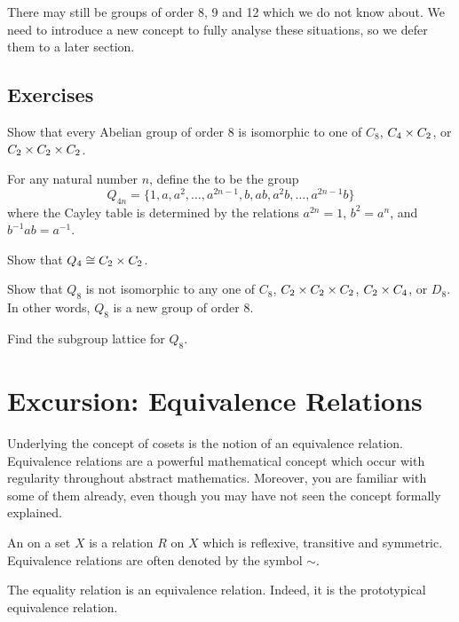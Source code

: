 There may still be groups of order 8, 9 and 12 which we do not know
about.  We need to introduce a new concept to fully analyse these
situations, so we defer them to a later section.

\subsection*{Exercises}

\begin{exercises}
  \item Show that every Abelian group of order 8 is isomorphic to one of
  $C_{8}$, $C_{4} \times C_{2}$, or $C_{2} \times C_{2} \times C_{2}$.
  
  \item\label{ex:quaterniongroup} For any natural number $n$, define the  to be the group
  \[
    Q_{4n} = \{1, a, a^{2}, \ldots, a^{2n-1}, b, ab, a^{2}b, \ldots, a^{2n-1}b \}
  \]
  where the Cayley table is determined by the relations $a^{2n} = 1$, $b^{2} =
  a^{n}$, and $b^{-1}ab = a^{-1}$.
  
  Show that $Q_{4} \cong C_{2} \times C_{2}$.
  
  Show that $Q_{8}$ is not isomorphic to any one of $C_{8}$, $C_{2} \times C_{2} \times
  C_{2}$, $C_{2} \times C_{4}$, or $D_{8}$.  In other words, $Q_{8}$ is a new
  group of order $8$.
  
  Find the subgroup lattice for $Q_{8}$.
\end{exercises}

\section{Excursion: Equivalence Relations}

Underlying the concept of cosets is the notion of an equivalence
relation.  Equivalence relations are a powerful mathematical concept
which occur with regularity throughout abstract mathematics. 
Moreover, you are familiar with some of them already, even though you
may have not seen the concept formally explained.

\begin{definition}
  An  on a set $X$ is a
  relation $R$ on $X$ which is reflexive, transitive and symmetric. 
  Equivalence relations are often denoted by the symbol $\sim$.
\end{definition}

\begin{example}
  The equality relation is an equivalence relation.  Indeed, it is the
  prototypical equivalence relation.
\end{example}

